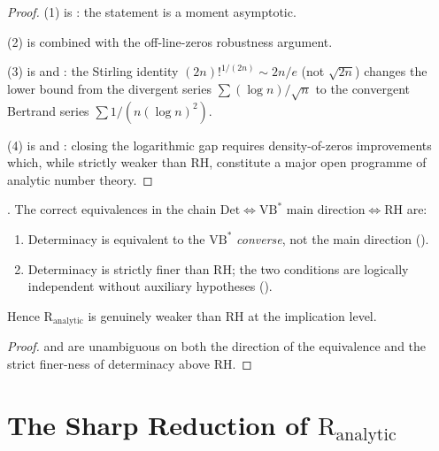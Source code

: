 \begin{proof}
(1) is : the statement is a
moment asymptotic.

(2) is  combined with
the off-line-zeros robustness argument.

(3) is  and
: the Stirling identity
\((2n)!^{1/(2n)}\sim 2n/e\) (not \(\sqrt{2n}\)) changes the lower
bound from the divergent series \(\sum(\log n)/\sqrt{n}\) to the
convergent Bertrand series \(\sum 1/(n(\log n)^{2})\).

(4) is  and
: closing the
logarithmic gap requires density-of-zeros improvements which,
while strictly weaker than RH, constitute a major open programme of
analytic number theory.
\end{proof}

\begin{corollary}
\label{v4-arith:r-audit:cor:hypothesis-also-wrong}
\ClaimStatusProvedHere. The correct equivalences in the chain
\(\mathrm{Det}\Leftrightarrow\mathrm{VB}^{*}\text{ main direction}
\Leftrightarrow\mathrm{RH}\) are:
\begin{enumerate}
\item Determinacy is equivalent to the \(\mathrm{VB}^{*}\)
\emph{converse}, not the main direction
().
\item Determinacy is strictly finer than RH; the two conditions are
logically independent without auxiliary hypotheses
().
\end{enumerate}
Hence \(\mathrm{R}_{\mathrm{analytic}}\) is genuinely weaker than RH
at the implication level.
\end{corollary}

\begin{proof}
 and
are unambiguous on both the direction of the equivalence and the
strict finer-ness of determinacy above RH.
\end{proof}

\section{The Sharp Reduction of \(\mathrm{R}_{\mathrm{analytic}}\)}
\label{v4-arith:r-audit:honest-reduction}

